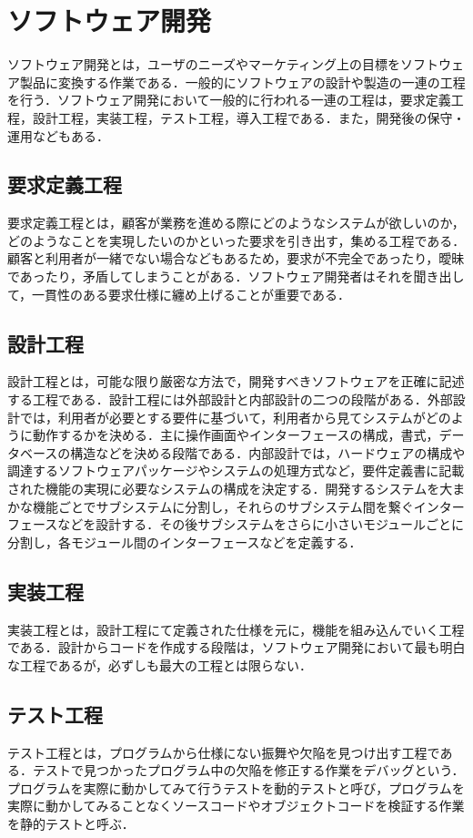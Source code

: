\section{ソフトウェア開発}

ソフトウェア開発とは，ユーザのニーズやマーケティング上の目標をソフトウェア製品に変換する作業である．一般的にソフトウェアの設計や製造の一連の工程を行う．ソフトウェア開発において一般的に行われる一連の工程は，要求定義工程，設計工程，実装工程，テスト工程，導入工程である．また，開発後の保守・運用などもある．

\subsection{要求定義工程}
要求定義工程とは，顧客が業務を進める際にどのようなシステムが欲しいのか，どのようなことを実現したいのかといった要求を引き出す，集める工程である．顧客と利用者が一緒でない場合などもあるため，要求が不完全であったり，曖昧であったり，矛盾してしまうことがある．ソフトウェア開発者はそれを聞き出して，一貫性のある要求仕様に纏め上げることが重要である．

\subsection{設計工程}
設計工程とは，可能な限り厳密な方法で，開発すべきソフトウェアを正確に記述する工程である．設計工程には外部設計と内部設計の二つの段階がある．外部設計では，利用者が必要とする要件に基づいて，利用者から見てシステムがどのように動作するかを決める．主に操作画面やインターフェースの構成，書式，データベースの構造などを決める段階である．内部設計では，ハードウェアの構成や調達するソフトウェアパッケージやシステムの処理方式など，要件定義書に記載された機能の実現に必要なシステムの構成を決定する．開発するシステムを大まかな機能ごとでサブシステムに分割し，それらのサブシステム間を繋ぐインターフェースなどを設計する．その後サブシステムをさらに小さいモジュールごとに分割し，各モジュール間のインターフェースなどを定義する．

\subsection{実装工程}
実装工程とは，設計工程にて定義された仕様を元に，機能を組み込んでいく工程である．設計からコードを作成する段階は，ソフトウェア開発において最も明白な工程であるが，必ずしも最大の工程とは限らない．

\subsection{テスト工程}
テスト工程とは，プログラムから仕様にない振舞や欠陥を見つけ出す工程である．テストで見つかったプログラム中の欠陥を修正する作業をデバッグという．プログラムを実際に動かしてみて行うテストを動的テストと呼び，プログラムを実際に動かしてみることなくソースコードやオブジェクトコードを検証する作業を静的テストと呼ぶ．

